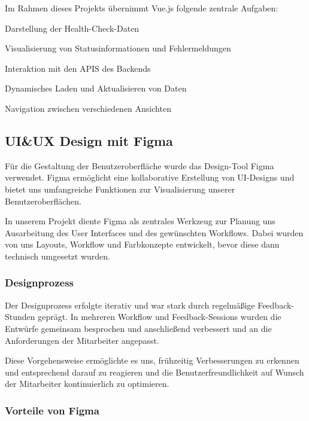 Im Rahmen dieses Projekts übernimmt Vue.js folgende zentrale Aufgaben:
\begin{compactitem}
    \item Darstellung der Health-Check-Daten
    \item Visualisierung von Statusinformationen und Fehlermeldungen
    \item Interaktion mit den APIS des Backends
    \item Dynamisches Laden und Aktualisieren von Daten
    \item Navigation zwischen verschiedenen Ansichten
\end{compactitem}
\cite{vuejs}


\subsection{UI\&UX Design mit Figma}

Für die Gestaltung der Benutzeroberfläche wurde das Design-Tool Figma verwendet.
Figma ermöglicht eine kollaborative Erstellung von UI-Designs und bietet uns umfangreiche Funktionen zur Visualisierung unserer Benutzeroberflächen.

In unserem Projekt diente Figma als zentrales Werkzeug zur Planung uns Ausarbeitung des User Interfaces und des gewünschten Workflows.
Dabei wurden von uns Layouts, Workflow und Farbkonzepte entwickelt, bevor diese dann technisch umgesetzt wurden.


\cite{figma}


\subsubsection{Designprozess}

Der Designprozess erfolgte iterativ und war stark durch regelmäßige Feedback-Stunden geprägt.
In mehreren Workflow und Feedback-Sessions wurden die Entwürfe gemeinsam besprochen und anschließend verbessert und an die Anforderungen der Mitarbeiter angepasst.

Diese Vorgehensweise ermöglichte es uns, frühzeitig Verbesserungen zu erkennen und entsprechend darauf zu reagieren und die Benutzerfreundlichkeit auf Wunsch der Mitarbeiter kontinuierlich zu optimieren.

\cite{figma}


\subsubsection{Vorteile von Figma}

